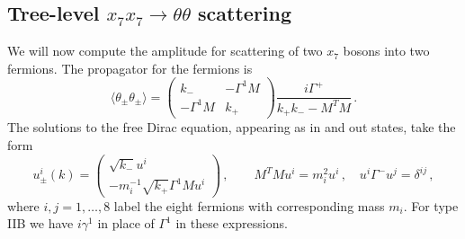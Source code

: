 \documentclass[a4paper,11pt]{article}
\begin{document}
\subsection{Tree-level $x_7x_7\rightarrow\theta\theta$ scattering}
We will now compute the amplitude for scattering of two $x_7$ bosons into two fermions. The propagator for the fermions is
\begin{equation}
\langle\theta_\pm\theta_\pm\rangle
=
\left(
\begin{array}{cc}
 k_- & -\Gamma^1M\\
-\Gamma^1M & k_+
\end{array}
\right)\frac{i\Gamma^+}{k_+k_--M^TM}
\,.
\end{equation}
The solutions to the free Dirac equation, appearing as in and out states, take the form
\begin{equation}
u^i_\pm(k)=\left(
\begin{array}{c}
\sqrt{k_-}u^i\\
-m_i^{-1}\sqrt{k_+}\Gamma^1Mu^i
\end{array}
\right)\,,\qquad
M^TMu^i=m_i^2u^i\,,\quad
u^i\Gamma^-u^j=\delta^{ij}\,,
\end{equation}
where $i,j=1,\ldots,8$ label the eight fermions with corresponding mass $m_i$. For type IIB we have $i\gamma^1$ in place of $\Gamma^1$ in these expressions.
\end{document}
